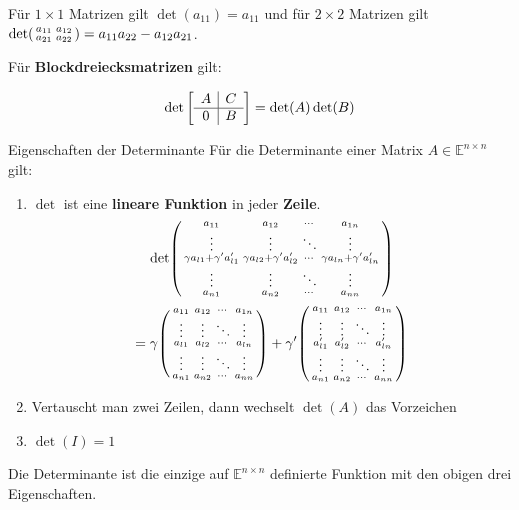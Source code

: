\documentclass[a4paper,10pt]{article}
\def\E{\mathbb{E}}
\begin{document}
Für $1 \times 1$ Matrizen gilt $\det(a_{11}) = a_{11}$ und für $2 \times 2$ Matrizen gilt $\det \begin{psmallmatrix}
  a_{11} & a_{12} \\
  a_{21} & a_{22}
\end{psmallmatrix} = a_{11} a_{22} - a_{12} a_{21}$.

Für \textbf{Blockdreiecksmatrizen} gilt:

$$
  \det \left[\begin{array}{ c | c }
    A & C \\
    \hline
    0 & B
  \end{array}\right] = \det(A) \det(B)$$


\begin{subbox}{Eigenschaften der Determinante}
  Für die Determinante einer Matrix $A \in \E^{n \times n}$ gilt:
  \begin{enumerate}
    \item{
      $\det$ ist eine \textbf{lineare Funktion} in jeder \textbf{Zeile}.\\
      $$\det \begin{psmallmatrix}
        a_{11} & a_{12} & \cdots & a_{1n} \\
        \vdots & \vdots & \ddots & \vdots \\
        \gamma a_{l1} + \gamma' a_{l1}' & \gamma a_{l2} + \gamma' a_{l2}' & \cdots & \gamma a_{ln} + \gamma' a_{ln}' \\
        \vdots & \vdots & \ddots & \vdots \\
        a_{n1} & a_{n2} & \cdots & a_{nn}
      \end{psmallmatrix}$$
      $$ = \gamma \begin{psmallmatrix}
        a_{11} & a_{12} & \cdots & a_{1n} \\
        \vdots & \vdots & \ddots & \vdots \\
        a_{l1} & a_{l2} & \cdots & a_{ln} \\
        \vdots & \vdots & \ddots & \vdots \\
        a_{n1} & a_{n2} & \cdots & a_{nn}
      \end{psmallmatrix} + \gamma' \begin{psmallmatrix}
        a_{11} & a_{12} & \cdots & a_{1n} \\
        \vdots & \vdots & \ddots & \vdots \\
        a_{l1}' & a_{l2}' & \cdots & a_{ln}' \\
        \vdots & \vdots & \ddots & \vdots \\
        a_{n1} & a_{n2} & \cdots & a_{nn}
      \end{psmallmatrix}$$
    }
    \item Vertauscht man zwei Zeilen, dann wechselt $\det(A)$ das Vorzeichen
    \item $\det(I) = 1$
  \end{enumerate}
  Die Determinante ist die einzige auf $\E^{n \times n}$ definierte Funktion mit den obigen drei Eigenschaften.
\end{subbox}
\end{document}
